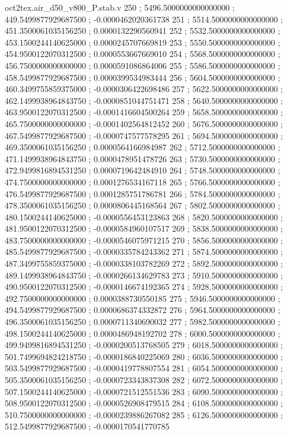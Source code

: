 \begin{filecontents}[overwrite]{oct2tex.air_d50_v800_P.stab.v}
250 ; 5496.5000000000000000 ; 449.5499877929687500 ; -0.0000462020361738
251 ; 5514.5000000000000000 ; 451.3500061035156250 ; 0.0000132290560941
252 ; 5532.5000000000000000 ; 453.1500244140625000 ; 0.0000245707669819
253 ; 5550.5000000000000000 ; 454.9500122070312500 ; 0.0000553667669010
254 ; 5568.5000000000000000 ; 456.7500000000000000 ; 0.0000591086864006
255 ; 5586.5000000000000000 ; 458.5499877929687500 ; 0.0000399534983444
256 ; 5604.5000000000000000 ; 460.3499755859375000 ; -0.0000306422698486
257 ; 5622.5000000000000000 ; 462.1499938964843750 ; -0.0000851044751471
258 ; 5640.5000000000000000 ; 463.9500122070312500 ; -0.0001416604500264
259 ; 5658.5000000000000000 ; 465.7500000000000000 ; -0.0001402564812452
260 ; 5676.5000000000000000 ; 467.5499877929687500 ; -0.0000747577578295
261 ; 5694.5000000000000000 ; 469.3500061035156250 ; 0.0000564166984987
262 ; 5712.5000000000000000 ; 471.1499938964843750 ; 0.0000478951478726
263 ; 5730.5000000000000000 ; 472.9499816894531250 ; 0.0000719642484910
264 ; 5748.5000000000000000 ; 474.7500000000000000 ; 0.0001276534167118
265 ; 5766.5000000000000000 ; 476.5499877929687500 ; 0.0001285751786781
266 ; 5784.5000000000000000 ; 478.3500061035156250 ; 0.0000806445168564
267 ; 5802.5000000000000000 ; 480.1500244140625000 ; -0.0000556453123863
268 ; 5820.5000000000000000 ; 481.9500122070312500 ; -0.0000584960107517
269 ; 5838.5000000000000000 ; 483.7500000000000000 ; -0.0000546075971215
270 ; 5856.5000000000000000 ; 485.5499877929687500 ; -0.0000335784243362
271 ; 5874.5000000000000000 ; 487.3499755859375000 ; -0.0000338103782269
272 ; 5892.5000000000000000 ; 489.1499938964843750 ; -0.0000266134629783
273 ; 5910.5000000000000000 ; 490.9500122070312500 ; -0.0000146674192365
274 ; 5928.5000000000000000 ; 492.7500000000000000 ; 0.0000388730550185
275 ; 5946.5000000000000000 ; 494.5499877929687500 ; 0.0000686374332872
276 ; 5964.5000000000000000 ; 496.3500061035156250 ; 0.0000711340690032
277 ; 5982.5000000000000000 ; 498.1500244140625000 ; 0.0000486948192702
278 ; 6000.5000000000000000 ; 499.9499816894531250 ; -0.0000200513768505
279 ; 6018.5000000000000000 ; 501.7499694824218750 ; -0.0000186840225069
280 ; 6036.5000000000000000 ; 503.5499877929687500 ; -0.0000419778807554
281 ; 6054.5000000000000000 ; 505.3500061035156250 ; -0.0000723343837308
282 ; 6072.5000000000000000 ; 507.1500244140625000 ; -0.0000721512551536
283 ; 6090.5000000000000000 ; 508.9500122070312500 ; -0.0000526908479515
284 ; 6108.5000000000000000 ; 510.7500000000000000 ; -0.0000239886267082
285 ; 6126.5000000000000000 ; 512.5499877929687500 ; -0.0000170541770785

\end{filecontents}
